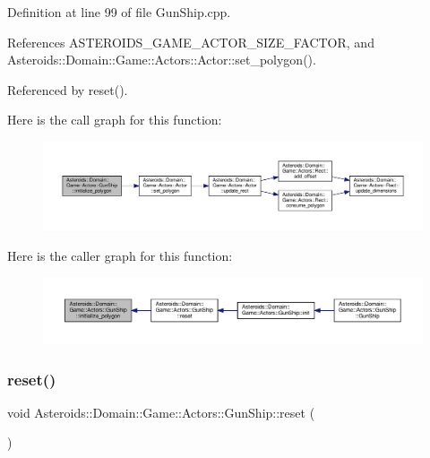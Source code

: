 Definition at line 99 of file Gun\+Ship.\+cpp.



References A\+S\+T\+E\+R\+O\+I\+D\+S\+\_\+\+G\+A\+M\+E\+\_\+\+A\+C\+T\+O\+R\+\_\+\+S\+I\+Z\+E\+\_\+\+F\+A\+C\+T\+OR, and Asteroids\+::\+Domain\+::\+Game\+::\+Actors\+::\+Actor\+::set\+\_\+polygon().



Referenced by reset().

Here is the call graph for this function\+:\nopagebreak
\begin{figure}[H]
\begin{center}
\leavevmode
\includegraphics[width=350pt]{classAsteroids_1_1Domain_1_1Game_1_1Actors_1_1GunShip_a4947769593f504d4342abcec5a01330b_cgraph}
\end{center}
\end{figure}
Here is the caller graph for this function\+:\nopagebreak
\begin{figure}[H]
\begin{center}
\leavevmode
\includegraphics[width=350pt]{classAsteroids_1_1Domain_1_1Game_1_1Actors_1_1GunShip_a4947769593f504d4342abcec5a01330b_icgraph}
\end{center}
\end{figure}
\mbox{\label{classAsteroids_1_1Domain_1_1Game_1_1Actors_1_1GunShip_a753c275a7840962c92cfe4843bcbd6ac}} 
\subsubsection{\texorpdfstring{reset()}{reset()}}
{\footnotesize\ttfamily void Asteroids\+::\+Domain\+::\+Game\+::\+Actors\+::\+Gun\+Ship\+::reset (\begin{DoxyParamCaption}{ }\end{DoxyParamCaption})}



